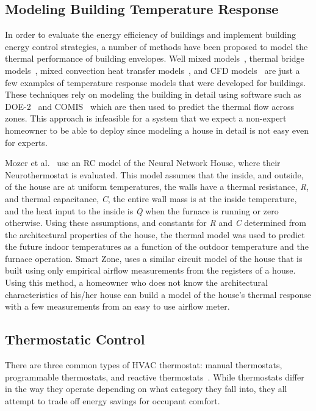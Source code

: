 \subsection{Modeling Building Temperature Response} 
In order to evaluate the energy efficiency of buildings and implement building
energy control strategies, a number of methods have been proposed to model the
thermal performance of building envelopes. Well mixed
models~\cite{haves1998standard, ahmed1996model}, thermal bridge
models~\cite{carpenter2001advances}, mixed convection heat transfer
models~\cite{beausoleil1999modelling}, and CFD models~\cite{peng1996modeling,
  ratnam1998advanced} are just a few examples of temperature response models
that were developed for buildings. These techniques rely on modeling the
building in detail using software such as DOE-2~\cite{birdsall1990overview} and
COMIS~\cite{feustel1999comis} which are then used to predict the thermal flow
across zones. This approach is infeasible for a system that we expect a
non-expert homeowner to be able to deploy since modeling a house in detail is
not easy even for experts. 

Mozer et al.~\cite{mozer1997neurothermostat} use an RC model of the Neural
Network House, where their Neurothermostat is evaluated. This model assumes that
the inside, and outside, of the house are at uniform temperatures, the walls
have a thermal resistance, {\em R}, and thermal capacitance, {\em C}, the entire
wall mass is at the inside temperature, and the heat input to the inside is {\em
  Q} when the furnace is running or zero otherwise. Using these assumptions, and
constants for {\em R} and {\em C} determined from the architectural properties
of the house, the thermal model was used to predict the future indoor
temperatures as a function of the outdoor temperature and the furnace
operation. Smart Zone, uses a similar circuit model of the house that is built
using only empirical airflow measurements from the registers of a house. Using
this method, a homeowner who does not know the architectural characteristics of
his/her house can build a model of the house's thermal response with a few
measurements from an easy to use airflow meter.

\subsection{Thermostatic Control}
There are three common types of HVAC thermostat: manual thermostats,
programmable thermostats, and reactive
thermostats~\cite{thermostatHistory}. While thermostats differ in the way they
operate depending on what category they fall into, they all attempt to trade off
energy savings for occupant comfort. 

